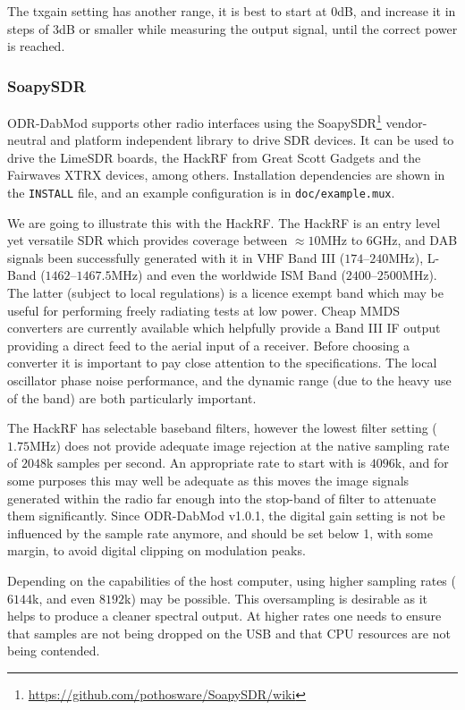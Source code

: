 The txgain setting has another range, it is best to start at $0$dB, and increase
it in steps of $3$dB or smaller while measuring the output signal, until the
correct power is reached.

\subsubsection{SoapySDR}
\label{otherhardware}
ODR-DabMod supports other radio interfaces using the
SoapySDR\footnote{\url{https://github.com/pothosware/SoapySDR/wiki}}
vendor-neutral and platform independent library to drive SDR devices. It can be
used to drive the LimeSDR boards, the HackRF from Great Scott Gadgets and the
Fairwaves XTRX devices, among others. Installation dependencies are shown in the
\texttt{INSTALL} file, and an example configuration is in
\texttt{doc/example.mux}.

We are going to illustrate this with the HackRF.
The HackRF is an entry level yet versatile SDR which provides coverage between
$\approx10$MHz to $6$GHz, and DAB signals been successfully generated with it in
VHF Band III ($174$--$240$MHz), L-Band ($1462$--$1467.5$MHz) and even the worldwide ISM
Band ($2400$--$2500$MHz). The latter (subject to local regulations) is a licence exempt
band which may be useful for performing freely radiating tests at low power. Cheap
MMDS converters are currently available which helpfully provide a Band III IF output
providing a direct feed to the aerial input of a receiver. Before choosing a converter
it is important to pay close attention to the specifications. The local oscillator
phase noise performance, and the dynamic range (due to the heavy use of the band) are
both particularly important.

The HackRF has selectable baseband filters, however the lowest filter setting
($1.75$MHz) does not provide adequate image rejection at the native sampling rate of
$2048$k samples per second. An appropriate rate to start with is $4096$k, and for
some purposes this may well be adequate as this moves the image signals
generated within the radio far enough into the stop-band of filter to attenuate
them significantly. Since ODR-DabMod v1.0.1, the digital gain setting is not
be influenced by the sample rate anymore, and should be set below 1, with some
margin, to avoid digital clipping on modulation peaks.

Depending on the capabilities of the host computer, using higher sampling rates
($6144$k, and even $8192$k) may be possible. This oversampling is desirable as
it helps to produce a cleaner spectral output. At higher rates one needs to
ensure that samples are not being dropped on the USB and that CPU resources are
not being contended.

